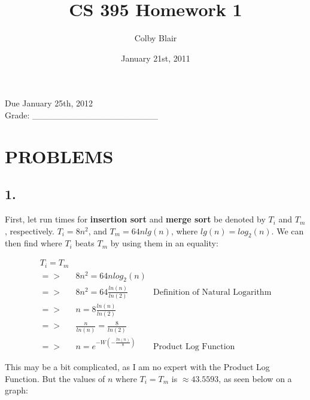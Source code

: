 \documentclass[11pt,letterpaper]{article}
\date{January 21st, 2011}
\title{CS 395 Homework 1}
\author{Colby Blair}
\begin{document}
\maketitle

\begin{center}
Due January 25th, 2012 \\

Grade: \_\_\_\_\_\_\_\_\_\_\_\_\_\_\_\_\_\_\_\_
\end{center}

\thispagestyle{empty}

\pagebreak

\section*{PROBLEMS}

\subsection*{1.}
First, let run times for \textbf{insertion sort} and \textbf{merge sort} be denoted by $T_i$ and $T_m$,
 respectively. $ T_i = 8n^2 $, and $ T_m = 64 n lg(n) $, where $ lg(n) = log_2 (n) $. We can then find where
$ T_i $ beats $ T_m $ by using them in an equality:

\begin{eqnarray}
	T_i = T_m & 						& \\
	=>	& 	8 n^2 = 64 n log_2 (n)		& \\
	=>	&	8 n^2 = 64 \frac{ln(n)}{ln(2)}	& \mbox{Definition of Natural Logarithm} \\
	=>	&	n = 8 \frac{ln(n)}{ln(2)}		& \\
	=>	&	\frac{n}{ln(n)} = \frac{8}{ln(2)}	& \\
	=>	&	n = e^{ -W( - \frac{ln(n)}{8} ) } & \mbox{Product Log Function}
\end{eqnarray}

This may be a bit complicated, as I am no expert with the Product Log Function. But the values of $ n $ 
where $ T_i = T_m $ is $ \approx 43.5593 $, as seen below on a graph:
\end{document}
